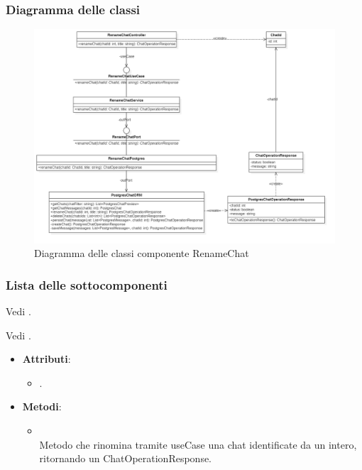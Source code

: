 \documentclass[10pt, a4paper]{article}
\begin{document}
\subsubsection{Diagramma delle classi}
\begin{figure}[H]
    \centering        
    \includegraphics[width=16.5cm]{img/RenameChat.png}
    \caption{Diagramma delle classi componente RenameChat}
\end{figure}

\subsubsection{Lista delle sottocomponenti}

Vedi .

Vedi .

\label{RenameChatControllerDettaglio}
\begin{itemize}
    \item \textbf{Attributi}:
    \begin{itemize}
        \item {}.
    \end{itemize}
    \item \textbf{Metodi}:
    \begin{itemize}
        \item {}\\
        Metodo che rinomina tramite useCase una chat identificate da un intero, ritornando un ChatOperationResponse.
    \end{itemize}
\end{itemize}
\end{document}
